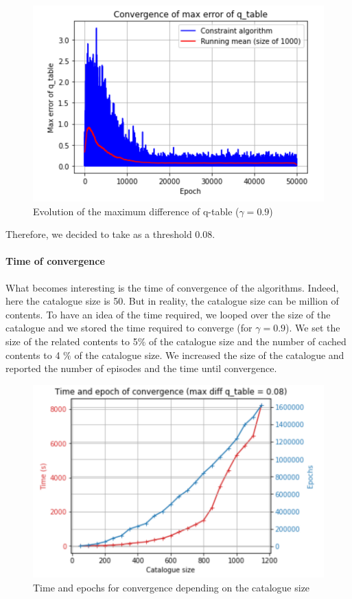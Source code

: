 \documentclass[a4paper]{article}
\begin{document}
    \begin{figure}[h!]
        \centering
        \includegraphics[scale=0.5]{img/convergence.png}
        \caption{Evolution of the maximum difference of q-table ($\gamma = 0.9$) }
        \label{fig:my_label}
    \end{figure}
    Therefore, we decided to take as a threshold 0.08.

    \paragraph{Time of convergence} What becomes interesting is the time of convergence of the algorithms. Indeed, here the catalogue size is 50. But in reality, the catalogue size can be million of contents. To have an idea of the time required, we looped over the size of the catalogue and we stored the time required to converge (for $\gamma = 0.9$). We set the size of the related contents to 5$\%$ of the catalogue size and the number of cached contents to 4 $\%$ of the catalogue size. We increased the size of the catalogue and reported the number of episodes and the time until convergence.
    
    \begin{figure}[h!]
        \centering
        \includegraphics[scale = 0.5]{img/convergence_time_epochs.png}
        \caption{Time and epochs for convergence depending on the catalogue size}
        \label{fig:my_label}
    \end{figure}
\end{document}
